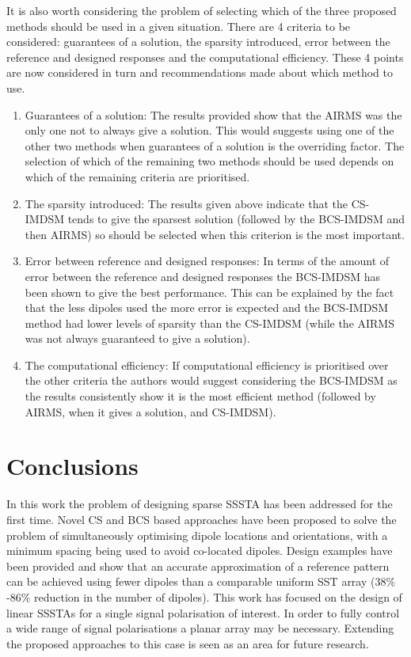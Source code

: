 \documentclass[10pt,final]{IEEEtran}
\begin{document}
It is also worth considering the problem of selecting which of the three proposed methods should be used in a given situation.  There are 4 criteria to be considered: guarantees of a solution, the sparsity introduced, error between the reference and designed responses and the computational efficiency.  These 4 points are now considered in turn and recommendations made about which method to use.
\begin{enumerate}
  \item Guarantees of a solution:  The results provided show that the AIRMS was the only one not to always give a solution.  This would suggests using one of the other two methods when guarantees of a solution is the overriding factor.  The selection of which of the remaining two methods should be used depends on which of the remaining criteria are prioritised.
  \item The sparsity introduced: The results given above indicate that the CS-IMDSM tends to give the sparsest solution (followed by the BCS-IMDSM and then AIRMS) so should be selected when this criterion is the most important.
  \item Error between reference and designed responses: In terms of the amount of error between the reference and designed responses the BCS-IMDSM has been shown to give the best performance. This can be explained by the fact that the less dipoles used the more error is expected and the BCS-IMDSM method had lower levels of sparsity than the CS-IMDSM (while the AIRMS was not always guaranteed to give a solution).
  \item The computational efficiency:  If computational efficiency is prioritised over the other criteria the authors would suggest considering the BCS-IMDSM as the results consistently show it is the most efficient method (followed by AIRMS, when it gives a solution, and CS-IMDSM).
\end{enumerate}


\section{Conclusions}\label{sec:con}
In this work the problem of designing sparse SSSTA has been addressed for the first time.
Novel CS and BCS based approaches have been proposed to solve the problem of simultaneously optimising
dipole locations and orientations,
with a minimum spacing being used to avoid co-located dipoles.  Design examples have been provided and
show that an accurate approximation of a reference pattern can be achieved using fewer dipoles than a
comparable uniform SST array (38$\%$-86$\%$ reduction in the number of dipoles). This work has focused
on the design of linear SSSTAs for a single signal polarisation of interest.  In order to fully control
a wide range of signal polarisations a planar array may be necessary.  Extending the proposed approaches to
this case is seen as an area for future research.
\end{document}
